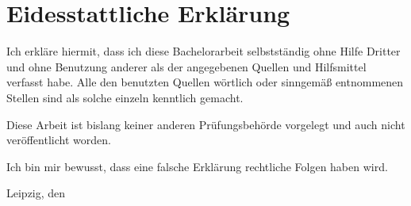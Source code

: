 \documentclass[12pt,a4paper]{scrartcl}
\begin{document}
	\addtocounter{table}{-1}	%
	
	
	\clearpage
	
	
	\clearpage
	\thispagestyle{empty}
	\section*{Eidesstattliche Erklärung}
	
	\smallskip
	Ich erkläre hiermit, dass ich diese Bachelorarbeit selbstständig ohne Hilfe Dritter und ohne Benutzung anderer als der angegebenen Quellen und Hilfsmittel verfasst habe. Alle den benutzten Quellen wörtlich oder sinngemäß entnommenen Stellen sind als solche einzeln kenntlich gemacht.
	
	\smallskip
	\noindent
	Diese Arbeit ist bislang keiner anderen Prüfungsbehörde vorgelegt und auch nicht veröffentlicht worden.
	
	\smallskip
	\noindent
	Ich bin mir bewusst, dass eine falsche Erklärung rechtliche Folgen haben wird.
	
	\bigskip
	\noindent
	Leipzig, den 
	
	\pagestyle{empty}
	\newpage %
	~
	
\end{document}
